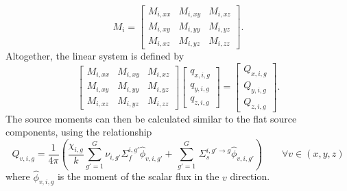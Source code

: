 \begin{equation}
M_i = 
\begin{bmatrix}
M_{i,xx} & M_{i,xy}  & M_{i,xz} \\
M_{i,xy} & M_{i,yy}  & M_{i,yz} \\
M_{i,xz} & M_{i,yz}  & M_{i,zz}
\end{bmatrix}.
\label{eq:linear-moment-matrix}
\end{equation}
Altogether, the linear system is defined by
\begin{equation}
\begin{bmatrix}
M_{i,xx} & M_{i,xy}  & M_{i,xz} \\
M_{i,xy} & M_{i,yy}  & M_{i,yz} \\
M_{i,xz} & M_{i,yz}  & M_{i,zz}
\end{bmatrix}
\begin{bmatrix}
q_{x,i,g} \\
q_{y,i,g} \\
q_{z,i,g}
\end{bmatrix}
=
\begin{bmatrix}
Q_{x,i,g} \\
Q_{y,i,g} \\
Q_{z,i,g}
\end{bmatrix}
.
\label{eq:moments-linear-sys}
\end{equation}
The source moments can then be calculated similar to the flat source components, using the relationship
\begin{equation}
Q_{v,i,g} = \frac{1}{4 \pi} \left( \frac{\chi_{i,g}}{k} \sum_{g'=1}^{G} \nu_{i,g'} \Sigma_f^{i,g'} \hat{\phi}_{v,i,g'} + \, \sum_{g'=1}^G \,  \Sigma_{s}^{i,g' \rightarrow g} \hat{\phi}_{v,i,g'} \right) \qquad \forall v \in (x,y,z)
\end{equation}
where $\hat{\phi}_{v,i,g}$ is the moment of the scalar flux in the $v$ direction. 


